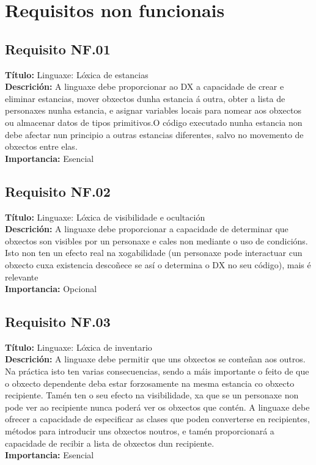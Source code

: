 \section{Requisitos non funcionais}

\subsection{Requisito NF.01}
{\bf Título:} Linguaxe: Lóxica de estancias\\
{\bf Descrición:} A linguaxe debe proporcionar ao DX a capacidade de crear e eliminar estancias, mover obxectos dunha estancia á outra, obter a lista de personaxes nunha estancia, e asignar variables locais para nomear aos obxectos ou almacenar datos de tipos primitivos.O código executado nunha estancia non debe afectar nun principio a outras estancias diferentes, salvo no movemento de obxectos entre elas.\\
{\bf Importancia:} Esencial

\subsection{Requisito NF.02}
{\bf Título:} Linguaxe: Lóxica de visibilidade e ocultación\\
{\bf Descrición:} A linguaxe debe proporcionar a capacidade de determinar que obxectos son visibles por un personaxe e cales non mediante o uso de condicións. Isto non ten un efecto real na xogabilidade (un personaxe pode interactuar cun obxecto cuxa existencia descoñece se así o determina o DX no seu código), mais é relevante \\
{\bf Importancia:} Opcional

\subsection{Requisito NF.03}
{\bf Título:} Linguaxe: Lóxica de inventario\\
{\bf Descrición:} A linguaxe debe permitir que uns obxectos se conteñan aos outros. Na práctica isto ten varias consecuencias, sendo a máis importante o feito de que o obxecto dependente deba estar forzosamente na mesma estancia co obxecto recipiente. Tamén ten o seu efecto na visibilidade, xa que se un personaxe non pode ver ao recipiente nunca poderá ver os obxectos que contén. A linguaxe debe ofrecer a capacidade de especificar as clases que poden converterse en recipientes, métodos para introducir uns obxectos noutros, e tamén proporcionará a capacidade de recibir a lista de obxectos dun recipiente.\\
{\bf Importancia:} Esencial

